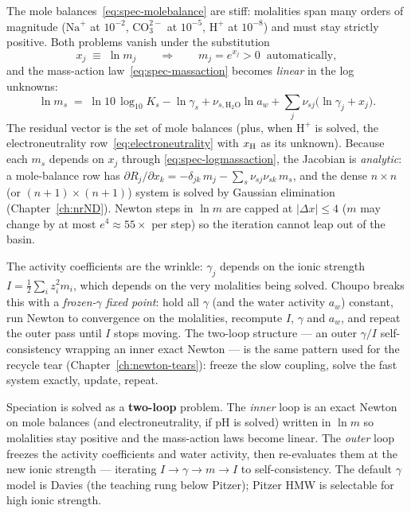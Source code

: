 \documentclass[11pt,a4paper]{article}
\begin{document}
The mole balances~\eqref{eq:spec-molebalance} are stiff: molalities span
many orders of magnitude ($\text{Na}^+$ at $10^{-2}$, $\text{CO}_3^{2-}$
at $10^{-5}$, $\text{H}^+$ at $10^{-8}$) and must stay strictly positive.
Both problems vanish under the substitution
\begin{equation}
   x_j \;\equiv\; \ln m_j
   \qquad\Longrightarrow\qquad
   m_j = e^{x_j} > 0 \;\;\text{automatically},
   \label{eq:spec-logvar}
\end{equation}
and the mass-action law~\eqref{eq:spec-massaction} becomes \emph{linear}
in the log unknowns:
\begin{equation}
   \ln m_s \;=\; \ln 10\,\log_{10}K_s - \ln\gamma_s
   + \nu_{s,\mathrm{H_2O}}\ln a_w
   + \sum_j \nu_{sj}\bigl(\ln\gamma_j + x_j\bigr).
   \label{eq:spec-logmassaction}
\end{equation}
The residual vector is the set of mole balances (plus, when $\text{H}^+$
is solved, the electroneutrality row~\eqref{eq:electroneutrality} with
$x_{\rm H}$ as its unknown).  Because each $m_s$ depends on $x_j$ through
\eqref{eq:spec-logmassaction}, the Jacobian is \emph{analytic}: a
mole-balance row has $\partial R_j/\partial x_k = -\delta_{jk}\,m_j -
\sum_s \nu_{sj}\nu_{sk}\,m_s$, and the dense $n\times n$ (or
$(n{+}1)\times(n{+}1)$) system is solved by Gaussian elimination
(Chapter~\ref{ch:nrND}).  Newton steps in $\ln m$ are capped at
$|\Delta x|\le 4$ ($m$ may change by at most $e^4\!\approx\!55\times$ per
step) so the iteration cannot leap out of the basin.

The activity coefficients are the wrinkle: $\gamma_j$ depends on the
ionic strength $I=\tfrac12\sum_i z_i^2 m_i$, which depends on the very
molalities being solved.  Choupo breaks this with a
\emph{frozen-$\gamma$ fixed point}: hold all $\gamma$ (and the water
activity $a_w$) constant, run Newton to convergence on the molalities,
recompute $I$, $\gamma$ and $a_w$, and repeat the outer pass until $I$
stops moving.  The two-loop structure --- an outer $\gamma/I$
self-consistency wrapping an inner exact Newton --- is the same pattern
used for the recycle tear (Chapter~\ref{ch:newton-tears}): freeze the slow
coupling, solve the fast system exactly, update, repeat.

\begin{keyidea}
Speciation is solved as a \textbf{two-loop} problem.  The \emph{inner}
loop is an exact Newton on mole balances (and electroneutrality, if pH is
solved) written in $\ln m$ so molalities stay positive and the
mass-action laws become linear.  The \emph{outer} loop freezes the
activity coefficients and water activity, then re-evaluates them at the
new ionic strength --- iterating $I \to \gamma \to m \to I$ to
self-consistency.  The default $\gamma$ model is Davies (the teaching
rung below Pitzer); Pitzer HMW is selectable for high ionic strength.
\end{keyidea}
\end{document}
